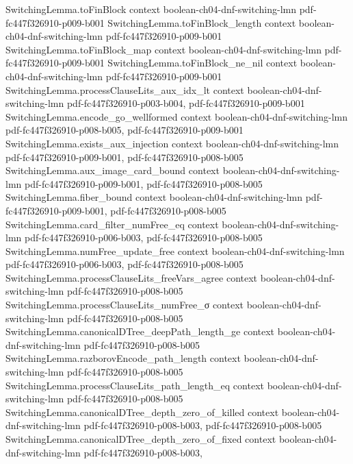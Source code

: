 \begin{theorem}
  {SwitchingLemma.toFinBlock}
  {context}
  {boolean-ch04-dnf-switching-lmn}
  {pdf-fc447f326910-p009-b001}
\proofstep
  {SwitchingLemma.toFinBlock_length}
  {context}
  {boolean-ch04-dnf-switching-lmn}
  {pdf-fc447f326910-p009-b001}
\proofstep
  {SwitchingLemma.toFinBlock_map}
  {context}
  {boolean-ch04-dnf-switching-lmn}
  {pdf-fc447f326910-p009-b001}
\proofstep
  {SwitchingLemma.toFinBlock_ne_nil}
  {context}
  {boolean-ch04-dnf-switching-lmn}
  {pdf-fc447f326910-p009-b001}
\proofstep
  {SwitchingLemma.processClauseLits_aux_idx_lt}
  {context}
  {boolean-ch04-dnf-switching-lmn}
  {pdf-fc447f326910-p003-b004,
    pdf-fc447f326910-p009-b001}
\proofstep
  {SwitchingLemma.encode_go_wellformed}
  {context}
  {boolean-ch04-dnf-switching-lmn}
  {pdf-fc447f326910-p008-b005,
    pdf-fc447f326910-p009-b001}
\proofstep
  {SwitchingLemma.exists_aux_injection}
  {context}
  {boolean-ch04-dnf-switching-lmn}
  {pdf-fc447f326910-p009-b001,
    pdf-fc447f326910-p008-b005}
\proofstep
  {SwitchingLemma.aux_image_card_bound}
  {context}
  {boolean-ch04-dnf-switching-lmn}
  {pdf-fc447f326910-p009-b001,
    pdf-fc447f326910-p008-b005}
\proofstep
  {SwitchingLemma.fiber_bound}
  {context}
  {boolean-ch04-dnf-switching-lmn}
  {pdf-fc447f326910-p009-b001,
    pdf-fc447f326910-p008-b005}
\proofstep
  {SwitchingLemma.card_filter_numFree_eq}
  {context}
  {boolean-ch04-dnf-switching-lmn}
  {pdf-fc447f326910-p006-b003,
    pdf-fc447f326910-p008-b005}
\proofstep
  {SwitchingLemma.numFree_update_free}
  {context}
  {boolean-ch04-dnf-switching-lmn}
  {pdf-fc447f326910-p006-b003,
    pdf-fc447f326910-p008-b005}
\proofstep
  {SwitchingLemma.processClauseLits_freeVars_agree}
  {context}
  {boolean-ch04-dnf-switching-lmn}
  {pdf-fc447f326910-p008-b005}
\proofstep
  {SwitchingLemma.processClauseLits_numFree_σ}
  {context}
  {boolean-ch04-dnf-switching-lmn}
  {pdf-fc447f326910-p008-b005}
\proofstep
  {SwitchingLemma.canonicalDTree_deepPath_length_ge}
  {context}
  {boolean-ch04-dnf-switching-lmn}
  {pdf-fc447f326910-p008-b005}
\proofstep
  {SwitchingLemma.razborovEncode_path_length}
  {context}
  {boolean-ch04-dnf-switching-lmn}
  {pdf-fc447f326910-p008-b005}
\proofstep
  {SwitchingLemma.processClauseLits_path_length_eq}
  {context}
  {boolean-ch04-dnf-switching-lmn}
  {pdf-fc447f326910-p008-b005}
\proofstep
  {SwitchingLemma.canonicalDTree_depth_zero_of_killed}
  {context}
  {boolean-ch04-dnf-switching-lmn}
  {pdf-fc447f326910-p008-b003,
    pdf-fc447f326910-p008-b005}
\proofstep
  {SwitchingLemma.canonicalDTree_depth_zero_of_fixed}
  {context}
  {boolean-ch04-dnf-switching-lmn}
  {pdf-fc447f326910-p008-b003,
}
\end{theorem}
